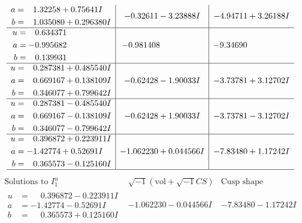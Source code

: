 \documentclass[1p]{elsarticle_modified}
\theoremstyle{definition}
\newcommand{\I}{\sqrt{-1}}
\begin{document}
$$\begin{array}{c|c|c}
\begin{aligned}
a &= \phantom{-}1.32258 + 0.75641 I \\
b &= \phantom{-}1.035080 + 0.296380 I\end{aligned}
 & -0.32611 - 3.23888 I & -4.94711 + 3.26188 I \\ \hline\begin{aligned}
u &= \phantom{-}0.634371\phantom{ +0.000000I} \\
a &= -0.995682\phantom{ +0.000000I} \\
b &= \phantom{-}0.139931\phantom{ +0.000000I}\end{aligned}
 & -0.981408\phantom{ +0.000000I} & -9.34690\phantom{ +0.000000I} \\ \hline\begin{aligned}
u &= \phantom{-}0.287381 + 0.485540 I \\
a &= \phantom{-}0.669167 + 0.138109 I \\
b &= \phantom{-}0.346077 + 0.799642 I\end{aligned}
 & -0.62428 - 1.90033 I & -3.73781 + 3.12702 I \\ \hline\begin{aligned}
u &= \phantom{-}0.287381 - 0.485540 I \\
a &= \phantom{-}0.669167 - 0.138109 I \\
b &= \phantom{-}0.346077 - 0.799642 I\end{aligned}
 & -0.62428 + 1.90033 I & -3.73781 - 3.12702 I \\ \hline\begin{aligned}
u &= \phantom{-}0.396872 + 0.223911 I \\
a &= -1.42774 + 0.52691 I \\
b &= \phantom{-}0.365573 - 0.125160 I\end{aligned}
 & -1.062230 + 0.044566 I & -7.83480 + 1.17242 I\\
 \hline 
 \end{array}$$\newpage$$\begin{array}{c|c|c}  
\text{Solutions to }I^u_{1}& \I (\text{vol} + \sqrt{-1}CS) & \text{Cusp shape}\\
 \hline 
\begin{aligned}
u &= \phantom{-}0.396872 - 0.223911 I \\
a &= -1.42774 - 0.52691 I \\
b &= \phantom{-}0.365573 + 0.125160 I\end{aligned}
 & -1.062230 - 0.044566 I & -7.83480 - 1.17242 I \\ \hline\begin{aligned}

\end{aligned}
\end{array}$$
\end{document}
